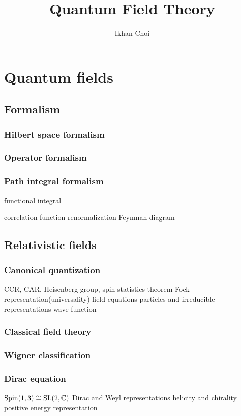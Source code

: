\documentclass{../../large}
\begin{document}
\title{Quantum Field Theory}
\author{Ikhan Choi}
\maketitle
\tableofcontents


\part{Quantum fields}

\chapter{Formalism}
\section{Hilbert space formalism}
\section{Operator formalism}
\section{Path integral formalism}
functional integral

correlation function
renormalization
Feynman diagram



\chapter{Relativistic fields}
\section{Canonical quantization}
CCR, CAR, Heisenberg group, spin-statistics theorem
Fock representation(universality)
field equations
particles and irreducible representations
wave function
\section{Classical field theory}
\section{Wigner classification}
\section{Dirac equation}
$\mathrm{Spin}(1,3)\cong\mathrm{SL}(2,\mathbb{C})$
Dirac and Weyl representations
helicity and chirality
positive energy representation
\end{document}
